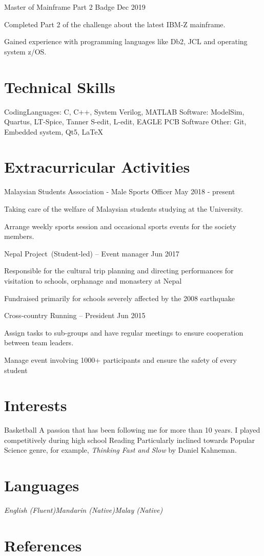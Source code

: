 \documentclass{myresume2}
\begin{document}
\simpleEntry
  {Master of Mainframe Part 2 Badge}
  {Dec 2019}
  {\item Completed Part 2 of the challenge about the latest IBM-Z mainframe.
  \item Gained experience with programming languages like Db2, JCL and operating system z/OS.}
%
%
%
%
\section{Technical Skills}
\twocolumnEntry
  {Coding\newline Languages:}
  {C, C++, System Verilog, MATLAB}
\twocolumnEntry
  {Software:}
  {ModelSim, Quartus, LT-Spice, Tanner S-edit, L-edit, EAGLE PCB Software}
\twocolumnEntry
  {Other:}
  {Git, Embedded system, Qt5, LaTeX}
%
%
%
%
\section{Extracurricular Activities}
%
\simpleEntry
  {Malaysian Students Association - Male Sports Officer}
  {May 2018 - present}
  {\item Taking care of the welfare of Malaysian students studying at the University.
  \item Arrange weekly sports session and occasional sports events for the society members.}

\simpleEntry
  {Nepal Project (Student-led) – Event manager}
  {Jun 2017}
  {\item Responsible for the cultural trip planning and directing performances for visitation to schools, orphanage and monastery at Nepal
  \item Fundraised primarily for schools severely affected by the 2008 earthquake}

\simpleEntry
  {Cross-country Running – President}
  {Jun 2015}
  {\item Assign tasks to sub-groups and have regular meetings to ensure cooperation between team leaders.
  \item Manage event involving 1000+ participants and ensure the safety of every student}
%
%
%
%
\section{Interests}
%
\twocolumnEntry
  {Basketball}
  {A passion that has been following me for more than 10 years. I played competitively during high school}
\twocolumnEntry
  {Reading}
  {Particularly inclined towards Popular Science genre, for example, \textit{Thinking Fast and Slow} by Daniel Kahneman.}
%
\section{Languages}
\textit{English (Fluent)\bigs Mandarin (Native)\bigs Malay (Native)}
%
\section{References}
%
\end{document}

